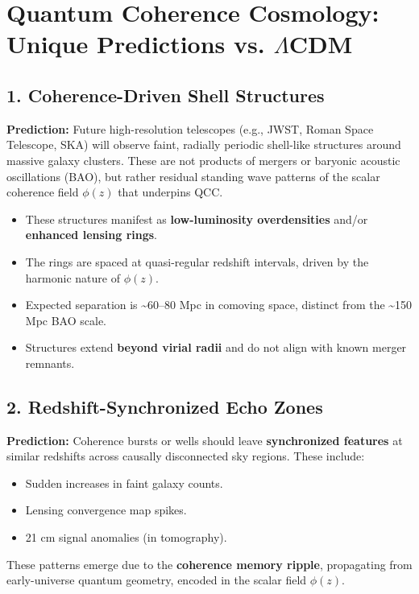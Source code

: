 
\section*{Quantum Coherence Cosmology: Unique Predictions vs. \(\Lambda\)CDM}

\subsection*{1. Coherence-Driven Shell Structures}

\textbf{Prediction:} Future high-resolution telescopes (e.g., JWST, Roman Space Telescope, SKA) will observe faint, radially periodic shell-like structures around massive galaxy clusters. These are not products of mergers or baryonic acoustic oscillations (BAO), but rather residual standing wave patterns of the scalar coherence field \( \phi(z) \) that underpins QCC.

\begin{itemize}
    \item These structures manifest as \textbf{low-luminosity overdensities} and/or \textbf{enhanced lensing rings}.
    \item The rings are spaced at quasi-regular redshift intervals, driven by the harmonic nature of \( \phi(z) \).
    \item Expected separation is \textasciitilde60--80 Mpc in comoving space, distinct from the \textasciitilde150 Mpc BAO scale.
    \item Structures extend \textbf{beyond virial radii} and do not align with known merger remnants.
\end{itemize}

\subsection*{2. Redshift-Synchronized Echo Zones}

\textbf{Prediction:} Coherence bursts or wells should leave \textbf{synchronized features} at similar redshifts across causally disconnected sky regions. These include:
\begin{itemize}
    \item Sudden increases in faint galaxy counts.
    \item Lensing convergence map spikes.
    \item 21 cm signal anomalies (in tomography).
\end{itemize}

These patterns emerge due to the \textbf{coherence memory ripple}, propagating from early-universe quantum geometry, encoded in the scalar field \( \phi(z) \). 

